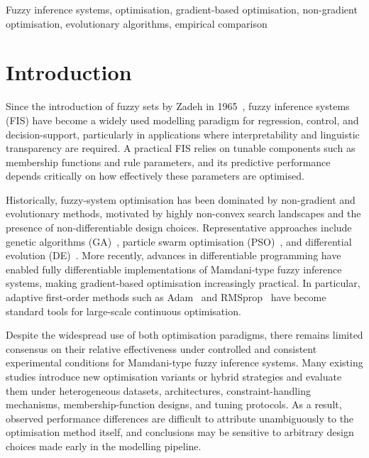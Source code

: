 \documentclass[a4paper,12pt,oneside]{article}
\begin{document}
\begin{IEEEkeywords}
Fuzzy inference systems, optimisation, gradient-based optimisation,
non-gradient optimisation, evolutionary algorithms, empirical comparison
\end{IEEEkeywords}

\section{Introduction}

Since the introduction of fuzzy sets by Zadeh in 1965~\cite{zadeh1965},
fuzzy inference systems (FIS) have become a widely used modelling paradigm
for regression, control, and decision-support, particularly in applications
where interpretability and linguistic transparency are required.
A practical FIS relies on tunable components such as membership functions
and rule parameters, and its predictive performance depends critically on
how effectively these parameters are optimised.

Historically, fuzzy-system optimisation has been dominated by non-gradient
and evolutionary methods, motivated by highly non-convex search landscapes
and the presence of non-differentiable design choices.
Representative approaches include genetic algorithms (GA)~\cite{holland1975ga},
particle swarm optimisation (PSO)~\cite{kennedy1995pso}, and differential
evolution (DE)~\cite{storn1997de}.
More recently, advances in differentiable programming have enabled fully
differentiable implementations of Mamdani-type fuzzy inference systems,
making gradient-based optimisation increasingly practical.
In particular, adaptive first-order methods such as Adam~\cite{kingma2015adam}
and RMSprop~\cite{tieleman2012rmsprop} have become standard tools for
large-scale continuous optimisation.

Despite the widespread use of both optimisation paradigms, there remains
limited consensus on their relative effectiveness under controlled and
consistent experimental conditions for Mamdani-type fuzzy inference systems.
Many existing studies introduce new optimisation variants or hybrid strategies
and evaluate them under heterogeneous datasets, architectures,
constraint-handling mechanisms, membership-function designs, and tuning
protocols.
As a result, observed performance differences are difficult to attribute
unambiguously to the optimisation method itself, and conclusions may be
sensitive to arbitrary design choices made early in the modelling pipeline.
\end{document}
